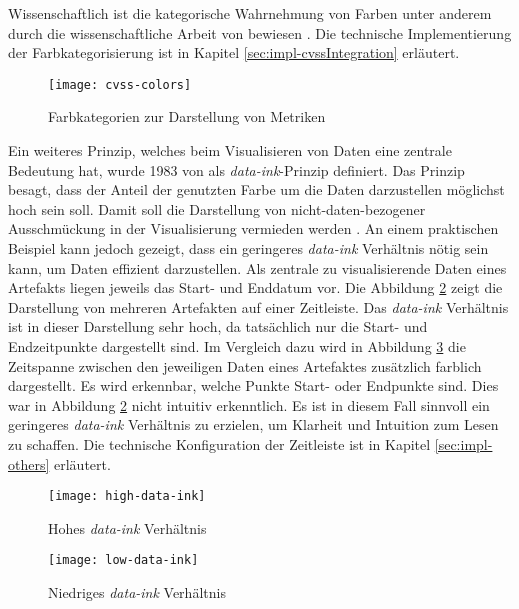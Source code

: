 Wissenschaftlich ist die kategorische Wahrnehmung von Farben unter anderem durch die wissenschaftliche Arbeit von \citeauthor{cliffordColorCategoriesAffect2010} bewiesen \autocite{cliffordColorCategoriesAffect2010}. Die technische Implementierung der Farbkategorisierung ist in Kapitel \ref{sec:impl-cvssIntegration} erläutert.
%
\begin{figure}
    \centering
    \texttt{[image: cvss-colors]}
    \caption{Farbkategorien zur Darstellung von Metriken}
    \label{fig:cvss-colors}
\end{figure}
%
\par Ein weiteres Prinzip, welches beim Visualisieren von Daten eine zentrale Bedeutung hat, wurde 1983 von \citeauthor{tufteBookReviewsVisual1984} als \textit{data-ink}-Prinzip definiert. Das Prinzip besagt, dass der Anteil der genutzten Farbe um die Daten darzustellen möglichst hoch sein soll. Damit soll die Darstellung von nicht-daten-bezogener Ausschmückung in der Visualisierung vermieden werden \autocite{tufteBookReviewsVisual1984}. An einem praktischen Beispiel kann jedoch gezeigt, dass ein geringeres \textit{data-ink} Verhältnis nötig sein kann, um Daten effizient darzustellen. Als zentrale zu visualisierende Daten eines Artefakts liegen jeweils das Start- und Enddatum vor. Die Abbildung \ref{fig:high-data-ink} zeigt die Darstellung von mehreren Artefakten auf einer Zeitleiste. Das \textit{data-ink} Verhältnis ist in dieser Darstellung sehr hoch, da tatsächlich nur die Start- und Endzeitpunkte dargestellt sind. Im Vergleich dazu wird in Abbildung \ref{fig:low-data-ink} die Zeitspanne zwischen den jeweiligen Daten eines Artefaktes zusätzlich farblich dargestellt. Es wird erkennbar, welche Punkte Start- oder Endpunkte sind. Dies war in Abbildung \ref{fig:high-data-ink} nicht intuitiv erkenntlich. Es ist in diesem Fall sinnvoll ein geringeres \textit{data-ink} Verhältnis zu erzielen, um Klarheit und Intuition zum Lesen zu schaffen. Die technische Konfiguration der Zeitleiste ist in Kapitel \ref{sec:impl-others} erläutert.
%
\begin{figure}
    \centering
    \texttt{[image: high-data-ink]}
    \caption{Hohes \textit{data-ink} Verhältnis}
    \label{fig:high-data-ink}
\end{figure}
%
\begin{figure}
    \centering
    \texttt{[image: low-data-ink]}
    \caption{Niedriges \textit{data-ink} Verhältnis}
    \label{fig:low-data-ink}
\end{figure}

